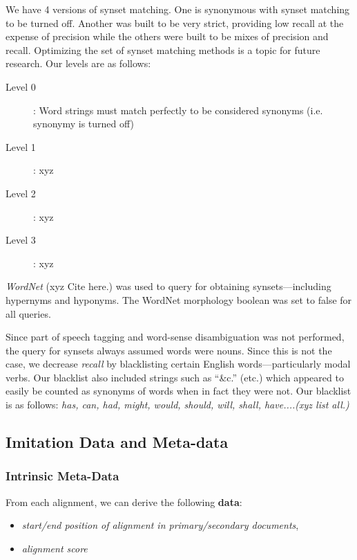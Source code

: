 We have 4 versions of synset matching. One is synonymous with synset matching to be turned off. Another was built to be very strict, providing low recall at the expense of precision while the others were built to be mixes of precision and recall. Optimizing the set of synset matching methods is a topic for future research. Our levels are as follows:

\begin{description}
	\item [Level 0]: Word strings must match perfectly to be considered synonyms (i.e. synonymy is turned off)
	\item [Level 1]: xyz
	\item [Level 2]: xyz
	\item [Level 3]: xyz
\end{description}


\textit{WordNet} (xyz Cite here.) was used to query for obtaining synsets---including hypernyms and hyponyms. The WordNet morphology boolean was set to false for all queries. 

Since part of speech tagging and word-sense disambiguation was not performed, the query for synsets always assumed words were nouns. Since this is not the case, we decrease \textit{recall} by blacklisting certain English words---particularly modal verbs. Our blacklist also included strings such as ``\&c.'' (etc.) which appeared to easily be counted as synonyms of words when in fact they were not. Our blacklist is as follows: \textit{has, can, had, might, would, should, will, shall, have....(xyz list all.)}


\subsection{Imitation Data and Meta-data}

\subsubsection{Intrinsic Meta-Data}
From each alignment, we can derive the following \textbf{data}:
	\begin{itemize}
		\item \textit{start/end position of alignment in primary/secondary documents},
		\item \textit{alignment score}
	\end{itemize}

